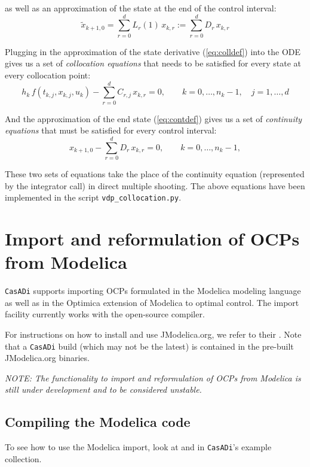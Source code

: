 \documentclass[a4paper,12pt]{book}
\newcommand{\CasADi}{\texttt{CasADi}\xspace}
\begin{document}
as well as an approximation of the state at the end of the control interval:
\begin{equation}
\tilde{x}_{k+1,0} = \sum_{r=0}^{d}{L_r(1) \, x_{k,r}} := \sum_{r=0}^{d}{D_r \, x_{k,r}}
\label{eq:contdef}
\end{equation}

Plugging in the approximation of the state derivative (\ref{eq:colldef}) into the ODE gives us a set of \emph{collocation equations} that needs to be satisfied for every state at every collocation point:
\begin{equation}
h_k \, f(t_{k,j},x_{k,j},u_k) - \sum_{r=0}^{d}{C_{r,j} \, x_{k,r}} = 0, \qquad k=0,\ldots,n_k-1, \quad j=1,\ldots,d
\end{equation}

And the approximation of the end state (\ref{eq:contdef}) gives us a set of \emph{continuity equations} that must be satisfied for every control interval:
\begin{equation}
x_{k+1,0} - \sum_{r=0}^{d}{D_r \, x_{k,r}} = 0, \qquad k=0,\ldots,n_k-1,
\end{equation}

These two sets of equations take the place of the continuity equation (represented by the integrator call) in direct multiple shooting. The above equations have been implemented in the script \texttt{vdp\_collocation.py}.

\chapter{Import and reformulation of OCPs from Modelica} \label{ch:modelica}
\CasADi supports importing OCPs formulated in the Modelica modeling language as well as in the Optimica extension of Modelica to optimal control. The import facility currently works with the open-source  compiler.

For instructions on how to install and use JModelica.org, we refer to their . Note that a \CasADi build (which may not be the latest) is contained in the pre-built JModelica.org binaries.

\emph{NOTE: The functionality to import and reformulation of OCPs from Modelica is still under development and to be considered unstable.}

\section{Compiling the Modelica code} \label{sec:modelica_compilation}
To see how to use the Modelica import, look at  and  in \CasADi's example collection.
\end{document}

